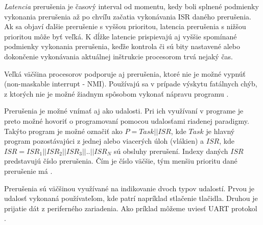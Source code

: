 \textit{Latencia} prerušenia je časový interval od momentu, kedy boli splnené podmienky vykonania prerušenia až po chvíľu začatia vykonávania ISR daného prerušenia.
Ak sa objaví ďalšie prerušenie s vyššou prioritou, latencia prerušenia s nižšou prioritou môže byť veľká.
K dĺžke latencie prispievajú aj vyššie spomínané podmienky vykonania prerušenia,
keďže kontrola či sú bity nastavené alebo dokončenie vykonávania aktuálnej inštrukcie procesorom trvá nejaký čas. \par
Veľká väčšina procesorov podporuje aj prerušenia, ktoré nie je možné vypnúť (non-maskable interrupt - NMI).
Používajú sa v prípade výskytu fatálnych chýb, z ktorých nie je možné žiadnym spôsobom vykonať nápravu programu
\cite{regehrSafeStructuredUse2007}. \par
Prerušenia je možné vnímať aj ako udalosti. Pri ich využívaní v programe je preto možné hovoriť o programovaní pomocou udalosťami riadenej paradigmy.
Takýto program je možné označiť ako \begin{math}P=Task || ISR\end{math}, kde \begin{math}Task\end{math} je hlavný program pozostávajúci z
jednej alebo viacerých úloh (vlákien) a  \begin{math}ISR\end{math}, kde \begin{math}ISR=ISR_1||ISR_2||ISR_3||..||ISR_N\end{math} sú obsluhy prerušení.
Indexy daných \begin{math}ISR\end{math} predstavujú číslo prerušenia.
Čím je číslo väčšie, tým menšiu prioritu dané prerušenie má \cite{wangAutomaticDetectionValidation2017}. \par
Prerušenia sú väčšinou využívané na indikovanie dvoch typov udalostí.  Prvou je udalosť vykonaná používateľom, kde patrí napríklad stlačenie tlačidla.
Druhou je prijatie dát z periferného zariadenia. Ako príklad môžeme uviesť UART protokol \cite{wangAutomaticDetectionValidation2017}.